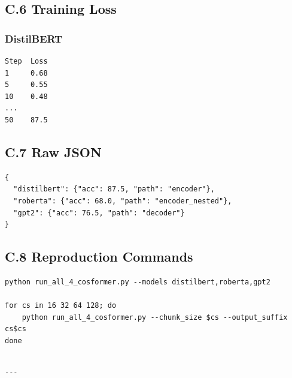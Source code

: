 \subsection{C.6 Training Loss}

\subsubsection{DistilBERT}

\begin{lstlisting}
Step  Loss
1     0.68
5     0.55
10    0.48
...
50    87.5
\end{lstlisting}

\subsection{C.7 Raw JSON}

\begin{lstlisting}
{
  "distilbert": {"acc": 87.5, "path": "encoder"},
  "roberta": {"acc": 68.0, "path": "encoder_nested"},
  "gpt2": {"acc": 76.5, "path": "decoder"}
}
\end{lstlisting}

\subsection{C.8 Reproduction Commands}

\begin{lstlisting}
python run_all_4_cosformer.py --models distilbert,roberta,gpt2

for cs in 16 32 64 128; do
    python run_all_4_cosformer.py --chunk_size $cs --output_suffix cs$cs
done
\end{lstlisting}
\begin{lstlisting}

---
\end{lstlisting}